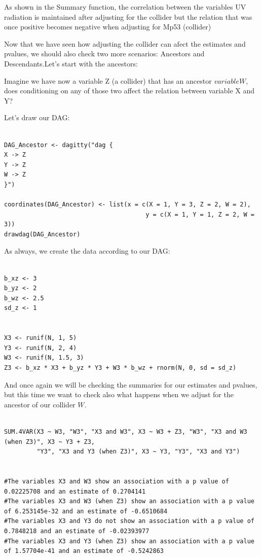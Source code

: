 \documentclass{article}
\begin{document}
As shown in the Summary function, the correlation between the variables UV  radiation is maintained after adjusting for the collider but the relation that was once positive becomes negative when adjusting for Mp53 (collider)


Now that we have seen how adjusting the collider can afect the estimates and pvalues, we should also check two more scenarios: Ancestors and Descendants.Let's start with the ancestors:



Imagine we have now a variable Z (a collider) that has an ancestor \(variable W\), does conditioning on any of those two affect the relation between variable X and Y?

Let's draw our DAG: 

\begin{lstlisting}

DAG_Ancestor <- dagitty("dag {
X -> Z
Y -> Z
W -> Z
}")

coordinates(DAG_Ancestor) <- list(x = c(X = 1, Y = 3, Z = 2, W = 2),
                                       y = c(X = 1, Y = 1, Z = 2, W = 3))
drawdag(DAG_Ancestor)

\end{lstlisting}




As always, we create the data according to our DAG:

\begin{lstlisting}

b_xz <- 3 
b_yz <- 2
b_wz <- 2.5
sd_z <- 1


X3 <- runif(N, 1, 5)
Y3 <- runif(N, 2, 4)
W3 <- runif(N, 1.5, 3)
Z3 <- b_xz * X3 + b_yz * Y3 + W3 * b_wz + rnorm(N, 0, sd = sd_z)

\end{lstlisting}


And once again we will be checking the summaries for our estimates and pvalues, but this time we want to check also what happens when we adjust for the ancestor of our collider \(W\).


\begin{lstlisting}

SUM.4VAR(X3 ~ W3, "W3", "X3 and W3", X3 ~ W3 + Z3, "W3", "X3 and W3 (when Z3)", X3 ~ Y3 + Z3, 
         "Y3", "X3 and Y3 (when Z3)", X3 ~ Y3, "Y3", "X3 and Y3")


#The variables X3 and W3 show an association with a p value of 0.02225708 and an estimate of 0.2704141 
#The variables X3 and W3 (when Z3) show an association with a p value of 6.253145e-32 and an estimate of -0.6510684 
#The variables X3 and Y3 do not show an association with a p value of 0.7848218 and an estimate of -0.02393977 
#The variables X3 and Y3 (when Z3) show an association with a p value of 1.57704e-41 and an estimate of -0.5242863 
\end{lstlisting}
\end{document}
